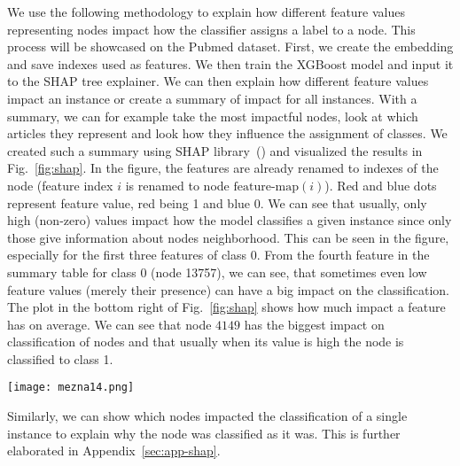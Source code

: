 \documentclass[twoside,11pt]{article}
\begin{document}
We use the following methodology to explain how different feature values representing nodes impact how the classifier assigns a label to a node. This process will be showcased on the Pubmed dataset. First, we create the embedding and save indexes used as features. We then train the XGBoost model and input it to the SHAP tree explainer. We can then explain how different feature values impact an instance or create a summary of impact for all instances. With a summary, we can for example take the most impactful nodes, look at which articles they represent and look how they influence the assignment of classes. We created such a summary using SHAP library~(\cite{lundberg2020local2global}) and visualized the results in Fig.~\ref{fig:shap}. In the figure, the features are already renamed to indexes of the node (feature index $i$ is renamed to node $\textrm{feature-map}(i)$). Red and blue dots represent feature value, red being 1 and blue 0. We can see that usually, only high (non-zero) values impact how the model classifies a given instance since only those give information about nodes neighborhood. This can be seen in the figure, especially for the first three features of class 0. From the fourth feature in the summary table for class 0 (node 13757), we can see, that sometimes even low feature values (merely their presence) can have a big impact on the classification. The plot in the bottom right of Fig.~\ref{fig:shap} shows how much impact a feature has on average. We can see that node $4149$ has the biggest impact on classification of nodes and that usually when its value is high the node is classified to class 1.

\begin{figure*}[t!]
  \centering
  \texttt{[image: mezna14.png]}
  \caption{SHAP summary on Pubmed dataset.}
  \label{fig:shap}
\end{figure*}

Similarly, we can show which nodes impacted the classification of a single instance to explain why the node was classified as it was. This is further elaborated in Appendix~\ref{sec:app-shap}.
\end{document}
